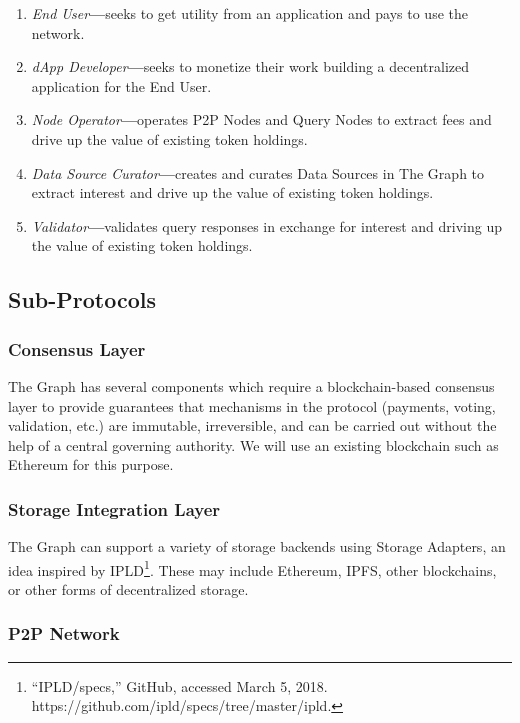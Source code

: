 \documentclass[12pt]{article}
\begin{document}
\begin{enumerate}
\item \textit{End User}\textbf{---}seeks to get utility from an application and
  pays to use the network.
\item \textit{dApp Developer}\textbf{---}seeks to monetize their work building a
  decentralized application for the End User.
\item \textit{Node Operator}\textbf{---}operates P2P Nodes and Query Nodes to
  extract fees and drive up the value of existing token holdings.
\item \textit{Data Source Curator}\textbf{---}creates and curates Data Sources
  in The Graph to extract interest and drive up the value of existing token
  holdings.
\item \textit{Validator}\textbf{---}validates query responses in exchange for
  interest and driving up the value of existing token holdings.
\end{enumerate}

\subsection{Sub-Protocols}

\subsubsection*{Consensus Layer}

The Graph has several components which require a blockchain-based consensus
layer to provide guarantees that mechanisms in the protocol (payments, voting,
validation, etc.) are immutable, irreversible, and can be carried out without
the help of a central governing authority. We will use an existing blockchain
such as Ethereum for this purpose.

\subsubsection*{Storage Integration Layer}

The Graph can support a variety of storage backends using Storage Adapters, an
idea inspired by IPLD\footnote{``IPLD/specs,'' GitHub, accessed March 5, 2018.
  https://github.com/ipld/specs/tree/master/ipld.}. These may include Ethereum,
IPFS, other blockchains, or other forms of decentralized storage.

\subsubsection*{P2P Network}
\end{document}

